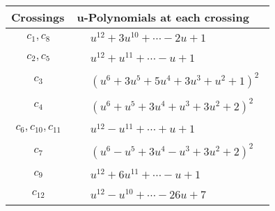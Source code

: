 \documentclass[1p]{elsarticle_modified}
\theoremstyle{definition}
\begin{document}
\begin{tabular}{m{50pt}|m{274pt}}
Crossings & \hspace{64pt}u-Polynomials at each crossing \\
\hline $$\begin{aligned}c_{1},c_{8}\end{aligned}$$&$\begin{aligned}
&u^{12}+3 u^{10}+\cdots-2 u+1
\end{aligned}$\\
\hline $$\begin{aligned}c_{2},c_{5}\end{aligned}$$&$\begin{aligned}
&u^{12}+u^{11}+\cdots- u+1
\end{aligned}$\\
\hline $$\begin{aligned}c_{3}\end{aligned}$$&$\begin{aligned}
&(u^6+3 u^5+5 u^4+3 u^3+u^2+1)^2
\end{aligned}$\\
\hline $$\begin{aligned}c_{4}\end{aligned}$$&$\begin{aligned}
&(u^6+u^5+3 u^4+u^3+3 u^2+2)^2
\end{aligned}$\\
\hline $$\begin{aligned}c_{6},c_{10},c_{11}\end{aligned}$$&$\begin{aligned}
&u^{12}- u^{11}+\cdots+u+1
\end{aligned}$\\
\hline $$\begin{aligned}c_{7}\end{aligned}$$&$\begin{aligned}
&(u^6- u^5+3 u^4- u^3+3 u^2+2)^2
\end{aligned}$\\
\hline $$\begin{aligned}c_{9}\end{aligned}$$&$\begin{aligned}
&u^{12}+6 u^{11}+\cdots- u+1
\end{aligned}$\\
\hline $$\begin{aligned}c_{12}\end{aligned}$$&$\begin{aligned}
&u^{12}- u^{10}+\cdots-26 u+7
\end{aligned}$\\
\hline
\end{tabular}\\~\\
\end{document}
